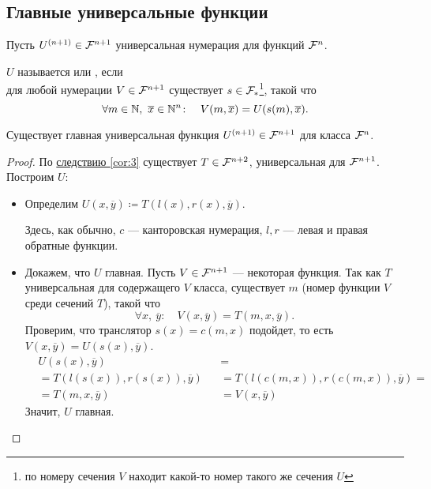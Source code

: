
\subsection{Главные универсальные функции}
\begin{defn}[]
	Пусть $ U^{(n+1)} \in \mathcal{F}^{n+1}$ универсальная нумерация для функций $ \mathcal{F}^{n}$. 

	\noindent
	$U$ называется  или , если \\ для любой нумерации $V \in \mathcal{F}^{n+1}$  существует  $ s \in \mathcal{F}_{*}$\footnote{по номеру сечения $ V$ находит какой-то номер такого же сечения $ U$}, такой что 
	\[
		\forall m \in \mathbb{N},~ \overline{x} \in \mathbb{N}^{n} \colon \quad V(m, \overline{x}) = U(s(m), \overline{x}) 
	.\] 
\end{defn}


\begin{thm}
	Существует главная универсальная функция $ U^{(n + 1)} \in \mathcal{F}^{n+1} $ для класса $ \mathcal{F}^{n}$.
\end{thm}
\begin{proof}
	По \hyperref[cor:3]{следствию \ref{cor:3}} существует $ T \in \mathcal{F}^{n+2}$, универсальная для $ \mathcal{F}^{n+1}$. Построим $ U$:
	\begin{itemize}
		\item Определим $ U(x, \overline{y}) \coloneqq T(l(x), r(x), \overline{y})$.

		Здесь, как обычно, $ c$ --- канторовская нумерация, $ l, r$ --- левая и правая обратные функции. 
	\item Докажем, что $ U$ главная. Пусть $ V \in \mathcal{F}^{n+1}$ --- некоторая функция.
		Так как $ T$ универсальная для содержащего $ V$ класса, существует $ m$ (номер функции $ V$ среди сечений $ T$), такой что
			\[
				\forall x,~ \overline{y}\colon \quad V(x, \overline{y}) = T(m, x, \overline{y})
			.\] 
			Проверим, что транслятор $ s(x) = c(m, x)$ подойдет, то есть $ V(x, \overline{y}) = U(s(x), \overline{y})$.
			\begin{align*}
				&U(s(x), \overline{y})  &&= \tag{По определению $ U$} \\
				&= T(l(s(x)), r(s(x)), \overline{y}) &&= T(l(c(m, x)), r(c(m, x)), \overline{y}) = \\
				&= T(m, x, \overline{y}) && = V(x, \overline{y})
			\end{align*}
			Значит, $ U$ главная.
	\end{itemize}
\end{proof}


